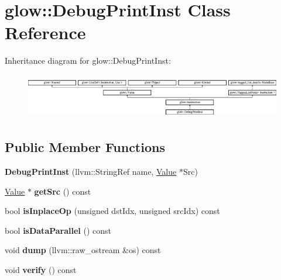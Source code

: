 \hypertarget{classglow_1_1_debug_print_inst}{}\section{glow\+:\+:Debug\+Print\+Inst Class Reference}
\label{classglow_1_1_debug_print_inst}
Inheritance diagram for glow\+:\+:Debug\+Print\+Inst\+:\begin{figure}[H]
\begin{center}
\leavevmode
\includegraphics[height=1.991111cm]{classglow_1_1_debug_print_inst}
\end{center}
\end{figure}
\subsection*{Public Member Functions}
\begin{DoxyCompactItemize}
\item 
\mbox{\label{classglow_1_1_debug_print_inst_aa59fdf475ca8d52c64ee372d2c44271b}} 
{\bfseries Debug\+Print\+Inst} (llvm\+::\+String\+Ref name, \hyperlink{classglow_1_1_value}{Value} $\ast$Src)
\item 
\mbox{\label{classglow_1_1_debug_print_inst_aa9cebbdd3b2b574d5d08487066c6a63b}} 
\hyperlink{classglow_1_1_value}{Value} $\ast$ {\bfseries get\+Src} () const
\item 
\mbox{\label{classglow_1_1_debug_print_inst_a48b8636c6aaae47c4b695be2143c6f58}} 
bool {\bfseries is\+Inplace\+Op} (unsigned dst\+Idx, unsigned src\+Idx) const
\item 
\mbox{\label{classglow_1_1_debug_print_inst_a0f60a6b1bc03c0dfd795ffa81212f736}} 
bool {\bfseries is\+Data\+Parallel} () const
\item 
\mbox{\label{classglow_1_1_debug_print_inst_ab104bec6a81122d9e7c3b5340cfebfd9}} 
void {\bfseries dump} (llvm\+::raw\+\_\+ostream \&os) const
\item 
\mbox{\label{classglow_1_1_debug_print_inst_aa20b4a2c93a88bb5cbededd44bb22933}} 
void {\bfseries verify} () const
\end{DoxyCompactItemize}

